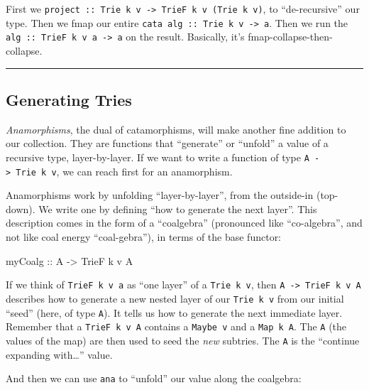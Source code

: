 \documentclass[]{article}
\newenvironment{Shaded}{}{}
\newcommand{\DataTypeTok}[1]{\textcolor[rgb]{0.56,0.13,0.00}{#1}}
\newcommand{\NormalTok}[1]{#1}
\newcommand{\OtherTok}[1]{\textcolor[rgb]{0.00,0.44,0.13}{#1}}
\begin{document}
First we
\texttt{project\ ::\ Trie\ k\ v\ -\textgreater{}\ TrieF\ k\ v\ (Trie\ k\ v)}, to
``de-recursive'' our type. Then we fmap our entire
\texttt{cata\ alg\ ::\ Trie\ k\ v\ -\textgreater{}\ a}. Then we run the
\texttt{alg\ ::\ TrieF\ k\ v\ a\ -\textgreater{}\ a} on the result. Basically,
it's fmap-collapse-then-collapse.

\begin{center}\rule{0.5\linewidth}{\linethickness}\end{center}

\hypertarget{generating-tries}{%
\subsection{Generating Tries}\label{generating-tries}}

\emph{Anamorphisms}, the dual of catamorphisms, will make another fine addition
to our collection. They are functions that ``generate'' or ``unfold'' a value of
a recursive type, layer-by-layer. If we want to write a function of type
\texttt{A\ -\textgreater{}\ Trie\ k\ v}, we can reach first for an anamorphism.

Anamorphisms work by unfolding ``layer-by-layer'', from the outside-in
(top-down). We write one by defining ``how to generate the next layer''. This
description comes in the form of a ``coalgebra'' (pronounced like
``co-algebra'', and not like coal energy ``coal-gebra''), in terms of the base
functor:

\begin{Shaded}
\begin{Highlighting}[]
\OtherTok{myCoalg ::} \DataTypeTok{A} \OtherTok{->} \DataTypeTok{TrieF}\NormalTok{ k v }\DataTypeTok{A}
\end{Highlighting}
\end{Shaded}

If we think of \texttt{TrieF\ k\ v\ a} as ``one layer'' of a
\texttt{Trie\ k\ v}, then \texttt{A\ -\textgreater{}\ TrieF\ k\ v\ A} describes
how to generate a new nested layer of our \texttt{Trie\ k\ v} from our initial
``seed'' (here, of type \texttt{A}). It tells us how to generate the next
immediate layer. Remember that a \texttt{TrieF\ k\ v\ A} contains a
\texttt{Maybe\ v} and a \texttt{Map\ k\ A}. The \texttt{A} (the values of the
map) are then used to seed the \emph{new} subtries. The \texttt{A} is the
``continue expanding with\ldots{}'' value.

And then we can use \texttt{ana} to ``unfold'' our value along the coalgebra:
\end{document}
